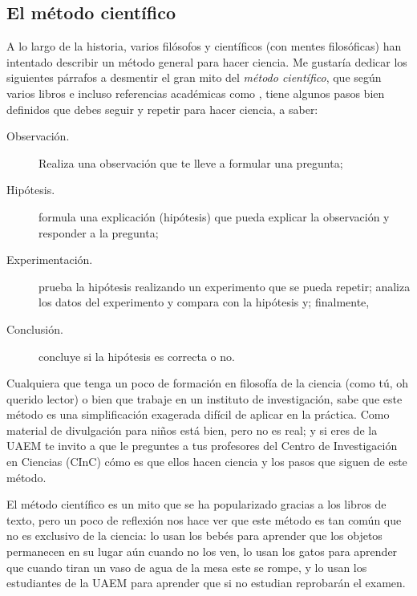 \subsection*{El método científico}
\label{sub:elmetodocientifico}
A lo largo de la historia, varios filósofos y científicos (con mentes
filosóficas) han intentado describir un método general para hacer ciencia.
Me gustaría dedicar los siguientes párrafos a desmentir el gran mito del
\emph{método científico}, que según varios libros e incluso referencias
académicas como \cite{Crawford1990}, tiene algunos pasos bien definidos que
debes seguir y repetir para hacer ciencia, a saber:
\begin{description}
    \item[Observación.] Realiza una observación que te lleve a formular
        una pregunta;
    \item[Hipótesis.] formula una explicación (hipótesis) que pueda explicar la
        observación y responder a la pregunta;
    \item[Experimentación.] prueba la hipótesis realizando un
        experimento que se pueda repetir; analiza los datos del experimento y
        compara con la hipótesis y; finalmente,
    \item[Conclusión.] concluye si la hipótesis es correcta o no.
\end{description}
Cualquiera que tenga un poco de formación en filosofía de la ciencia (como tú,
oh querido lector) o bien que trabaje en un instituto de investigación, sabe que
este método es una simplificación exagerada difícil de aplicar en la práctica.
Como material de divulgación para niños está bien, pero no es real; y si eres de
la UAEM te invito a que le preguntes a tus profesores del Centro de
Investigación en Ciencias (CInC) cómo es que ellos hacen ciencia y los pasos que
siguen de este método.

El método científico es un mito que se ha popularizado gracias a los libros de
texto, pero un poco de reflexión nos hace ver que este método es tan común que
no es exclusivo de la ciencia: lo usan los bebés para aprender que los objetos
permanecen en su lugar aún cuando no los ven, lo usan los gatos para aprender
que cuando tiran un vaso de agua de la mesa este se rompe, y lo usan los
estudiantes de la UAEM para aprender que si no estudian reprobarán el examen.

